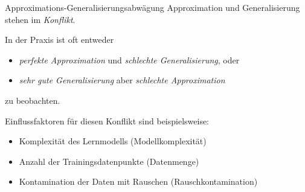 \begin{defi}{Approximations-Generalisierungsabwägung}
    Approximation und Generalisierung stehen im \emph{Konflikt}.

    In der Praxis ist oft entweder
    \begin{itemize}
        \item \emph{perfekte Approximation} und \emph{schlechte Generalisierung}, oder
        \item \emph{sehr gute Generalisierung} aber \emph{schlechte Approximation}
    \end{itemize}
    zu beobachten.

    Einflussfaktoren für diesen Konflikt sind beispielsweise:
    \begin{itemize}
        \item Komplexität des Lernmodells (Modellkomplexität)
        \item Anzahl der Trainingsdatenpunkte (Datenmenge)
        \item Kontamination der Daten mit Rauschen (Rauschkontamination)
    \end{itemize}
\end{defi}

